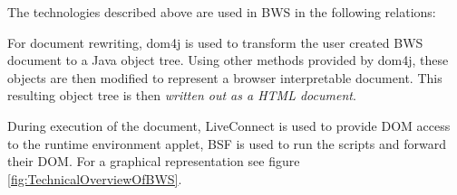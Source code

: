 The technologies described above are used in BWS in the following relations:

For document rewriting, dom4j is used to transform the user created BWS document to a Java object tree. Using other methods provided by dom4j, these objects are then modified to represent a browser interpretable document. This resulting object tree is then \emph{written out as a HTML document}.

During execution of the document, LiveConnect is used to provide DOM access to the runtime environment applet, BSF is used to run the scripts and forward their DOM. For a graphical representation see figure \ref{fig:TechnicalOverviewOfBWS}.